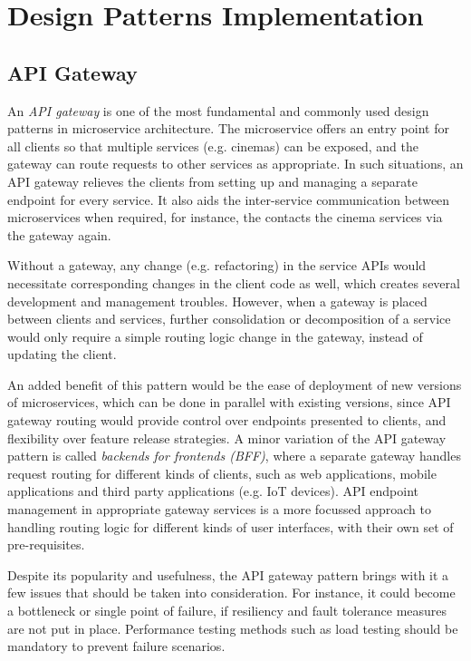 \section{Design Patterns Implementation}

\subsection{API Gateway}

An \textit{API gateway} is one of the most fundamental and commonly used design patterns in microservice architecture. The  microservice offers an entry point for all clients so that multiple services (e.g. cinemas) can be exposed, and the gateway can route requests to other services as appropriate. In such situations, an API gateway relieves the clients from setting up and managing a separate endpoint for every service. It also aids the inter-service communication between microservices when required, for instance, the  contacts the cinema services via the gateway again.

Without a gateway, any change (e.g. refactoring) in the service APIs would necessitate corresponding changes in the client code as well, which creates several development and management troubles. However, when a gateway is placed between clients and services, further consolidation or decomposition of a service would only require a simple routing logic change in the gateway, instead of updating the client.

An added benefit of this pattern would be the ease of deployment of new versions of microservices, which can be done in parallel with existing versions, since API gateway routing would provide control over endpoints presented to clients, and flexibility over feature release strategies. A minor variation of the API gateway pattern is called \textit{backends for frontends (BFF)}, where a separate gateway handles request routing for different kinds of clients, such as web applications, mobile applications and third party applications (e.g. IoT devices). API endpoint management in appropriate gateway services is a more focussed approach to handling routing logic for different kinds of user interfaces, with their own set of pre-requisites.

Despite its popularity and usefulness, the API gateway pattern brings with it a few issues that should be taken into consideration. For instance, it could become a bottleneck or single point of failure, if resiliency and fault tolerance measures are not put in place. Performance testing methods such as load testing should be mandatory to prevent failure scenarios.

